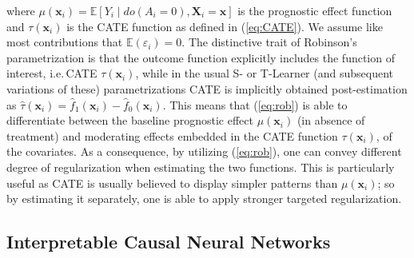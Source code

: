 \documentclass[nohyperref]{article}
\theoremstyle{plain}
\theoremstyle{definition}
\theoremstyle{remark}
\begin{document}
where $\mu (\bm{x}_i) = \mathbb{E} [ Y_i \mid do(A_i = 0), \bm{X}_i = \bm{x} ]$ is the prognostic effect function and $\tau (\bm{x}_i)$ is the CATE function as defined in (\ref{eq:CATE}). We assume like most contributions that $\mathbb{E} (\varepsilon_i) = 0$. The distinctive trait of Robinson's parametrization is that the outcome function explicitly includes the function of interest, i.e.\,CATE $\tau (\bm{x}_i)$, while in the usual S- or T-Learner (and subsequent variations of these) parametrizations CATE is implicitly obtained post-estimation as $\hat{\tau} (\bm{x}_i) = \hat{f}_1 (\bm{x}_i) - \hat{f}_0 (\bm{x}_i)$. This means that (\ref{eq:rob}) is able to differentiate between the baseline prognostic effect $\mu(\bm{x}_i)$ (in absence of treatment) and moderating effects embedded in the CATE function $\tau (\bm{x}_i)$, of the covariates. As a consequence, by utilizing (\ref{eq:rob}), one can convey different degree of regularization when estimating the two functions. This is particularly useful as CATE is usually believed to display simpler patterns than $\mu(\bm{x}_i)$; so by estimating it separately, one is able to apply stronger targeted regularization.


\subsection{Interpretable Causal Neural Networks}
\end{document}
